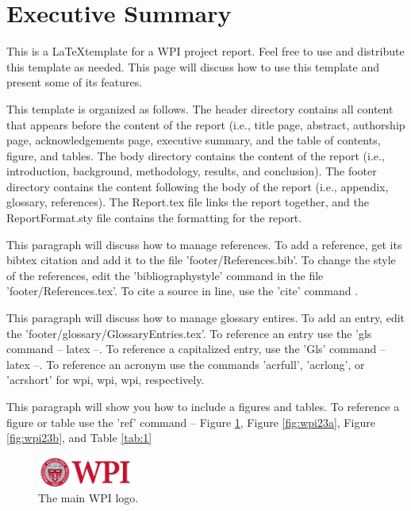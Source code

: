 \chapter*{Executive Summary}

This is a \LaTeX template for a WPI project report. Feel free to use and distribute this template as needed. This page will discuss how to use this template and present some of its features. 

This template is organized as follows. The header directory contains all content that appears before the content of the report (i.e., title page, abstract, authorship page, acknowledgements page, executive summary, and the table of contents, figure, and tables. The body directory contains the content of the report (i.e., introduction, background, methodology, results, and conclusion). The footer directory contains the content following the body of the report (i.e., appendix, glossary, references). The Report.tex file links the report together, and the ReportFormat.sty file contains the formatting for the report. 

This paragraph will discuss how to manage references. To add a reference, get its bibtex citation and add it to the file 'footer/References.bib'. To change the style of the references, edit the 'bibliographystyle' command in the file 'footer/References.tex'. To cite a source in line, use the 'cite' command \cite{source1}.

This paragraph will discuss how to manage glossary entires. To add an entry, edit the 'footer/glossary/GlossaryEntries.tex'. To reference an entry use the 'gls command -- \gls{latex} --. To reference a capitalized entry, use the 'Gls' command -- \Gls{latex} --. To reference an acronym use the commands 'acrfull', 'acrlong', or 'acrshort' for \acrfull{wpi}, \acrlong{wpi}, \acrshort{wpi}, respectively.


This paragraph will show you how to include a figures and tables. To reference a figure or table use the 'ref' command -- Figure \ref{fig:wpi1}, Figure \ref{fig:wpi23a}, Figure \ref{fig:wpi23b}, and Table \ref{tab:1}

\begin{figure}
    \centering
    \includegraphics[height=1cm]{header/executivesummary/wpi1.png}
    \caption{The main WPI logo.}
    \label{fig:wpi1}
\end{figure}

